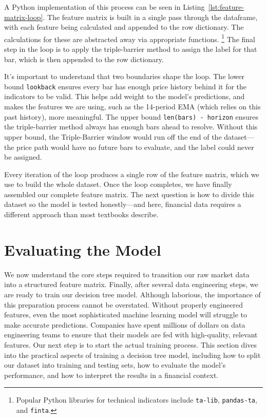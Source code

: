 A Python implementation of this process can be seen in Listing~\ref{lst:feature-matrix-loop}. 
The feature matrix is built in a single pass through the dataframe, with each feature being calculated and appended to the row dictionary. 
The calculations for these are abstracted away via appropriate functions.
\footnote{Popular Python libraries for technical indicators include \texttt{ta-lib}, \texttt{pandas-ta}, and \texttt{finta}.}
The final step in the loop is to apply the triple-barrier method to assign the label for that bar, which is then appended to the row dictionary.

It's important to understand that two boundaries shape the loop.
The lower bound \texttt{lookback} ensures every bar has enough price history behind it for the indicators to be valid.
This helps add weight to the model's predictions, and makes the features we are using, such as the 14-period EMA (which relies on this past history), more meaningful.
The upper bound \texttt{len(bars) - horizon} ensures the triple-barrier method always has enough bars ahead to resolve.
Without this upper bound, the Triple-Barrier window would run off the end of the dataset---the price path would have no future bars to evaluate, and the label could never be assigned.

Every iteration of the loop produces a single row of the feature matrix, which we use to build the whole dataset. 
Once the loop completes, we have finally assembled our complete feature matrix. 
The next question is how to divide this dataset so the model is tested honestly---and here, financial data requires a different approach than most textbooks describe.




\section{Evaluating the Model}\label{sec:evaluation}

We now understand the core steps required to transition our raw market data into a structured feature matrix. 
Finally, after several data engineering steps, we are ready to train our decision tree model. 
Although laborious, the importance of this preparation process cannot be overstated. 
Without properly engineered features, even the most sophisticated machine learning model will struggle to make accurate predictions. 
Companies have spent millions of dollars on data engineering teams to ensure that their models are fed with high-quality, relevant features.
Our next step is to start the actual training process. 
This section dives into the practical aspects of training a decision tree model, including how to split our dataset into training and testing sets, how to evaluate the model's performance, and how to interpret the results in a financial context.

